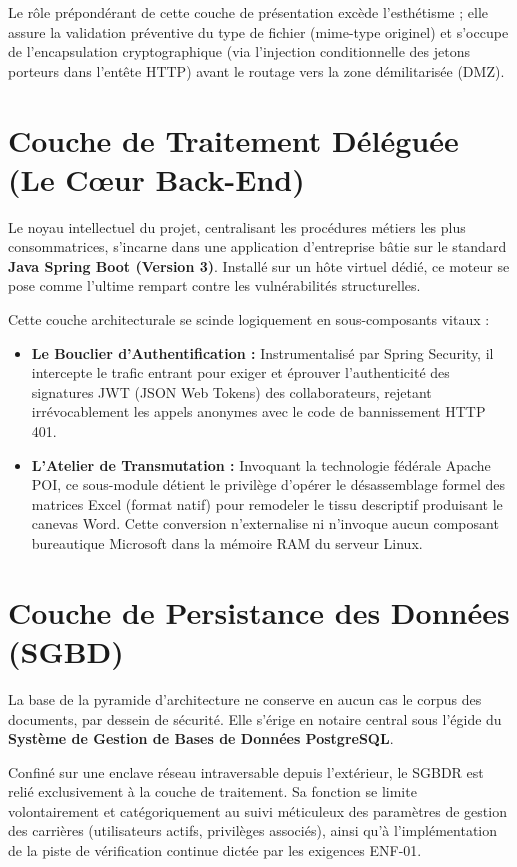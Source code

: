 \documentclass[12pt,a4paper,twoside]{report}
\begin{document}
Le rôle prépondérant de cette couche de présentation excède l'esthétisme ; elle assure la validation préventive du type de fichier (mime-type originel) et s'occupe de l'encapsulation cryptographique (via l'injection conditionnelle des jetons porteurs dans l'entête HTTP) avant le routage vers la zone démilitarisée (DMZ).

\section{Couche de Traitement Déléguée (Le Cœur Back-End)}
Le noyau intellectuel du projet, centralisant les procédures métiers les plus consommatrices, s'incarne dans une application d'entreprise bâtie sur le standard \textbf{Java Spring Boot (Version 3)}. Installé sur un hôte virtuel dédié, ce moteur se pose comme l'ultime rempart contre les vulnérabilités structurelles. 

Cette couche architecturale se scinde logiquement en sous-composants vitaux :
\begin{itemize}
    \item \textbf{Le Bouclier d'Authentification :} Instrumentalisé par Spring Security, il intercepte le trafic entrant pour exiger et éprouver l'authenticité des signatures JWT (JSON Web Tokens) des collaborateurs, rejetant irrévocablement les appels anonymes avec le code de bannissement HTTP 401.
    \item \textbf{L'Atelier de Transmutation :} Invoquant la technologie fédérale Apache POI, ce sous-module détient le privilège d'opérer le désassemblage formel des matrices Excel (format natif) pour remodeler le tissu descriptif produisant le canevas Word. Cette conversion n'externalise ni n'invoque aucun composant bureautique Microsoft dans la mémoire RAM du serveur Linux. 
\end{itemize}

\section{Couche de Persistance des Données (SGBD)}
La base de la pyramide d'architecture ne conserve en aucun cas le corpus des documents, par dessein de sécurité. Elle s'érige en notaire central sous l'égide du \textbf{Système de Gestion de Bases de Données PostgreSQL}.

Confiné sur une enclave réseau intraversable depuis l'extérieur, le SGBDR est relié exclusivement à la couche de traitement. Sa fonction se limite volontairement et catégoriquement au suivi méticuleux des paramètres de gestion des carrières (utilisateurs actifs, privilèges associés), ainsi qu'à l'implémentation de la piste de vérification continue dictée par les exigences ENF-01.
\end{document}
